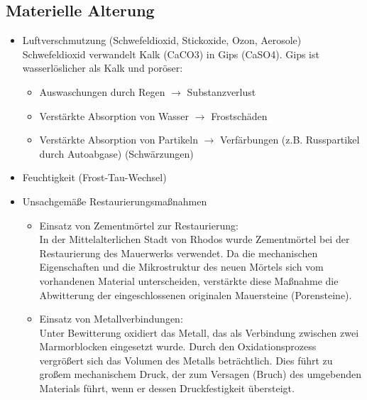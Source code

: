 \documentclass[fleqn,twoside,dvipsnames]{article}
\begin{document}
\begin{itemize}
        \subsection{Materielle Alterung} \label{EinflussBauteile}
                \begin{itemize}
                    \item Luftverschmutzung (Schwefeldioxid, Stickoxide, Ozon, Aerosole)\\
                        Schwefeldioxid verwandelt Kalk (CaCO3) in Gips (CaSO4). Gips ist wasserlöslicher als Kalk und poröser:
                            \begin{itemize}
                                \item Auswaschungen durch Regen $\rightarrow$ Substanzverlust
                                \item Verstärkte Absorption von Wasser $\rightarrow$ Frostschäden
                                \item Verstärkte Absorption von Partikeln $\rightarrow$ Verfärbungen (z.B. Russpartikel durch Autoabgase) (Schwärzungen)
                            \end{itemize}
                    \item Feuchtigkeit (Frost-Tau-Wechsel)
                    \item Unsachgemäße Restaurierungsmaßnahmen
                        \begin{itemize}
                            \item Einsatz von Zementmörtel zur Restaurierung:\\
                                In der Mittelalterlichen Stadt von Rhodos wurde Zementmörtel bei der Restaurierung des Mauerwerks verwendet. Da die mechanischen Eigenschaften und die Mikrostruktur des neuen Mörtels sich vom vorhandenen Material unterscheiden, verstärkte diese Maßnahme die Abwitterung der eingeschlossenen originalen Mauersteine (Porensteine).
                            \item Einsatz von Metallverbindungen:\\
                                Unter Bewitterung oxidiert das Metall, das als Verbindung zwischen zwei Marmorblocken eingesetzt wurde. Durch den Oxidationsprozess vergrößert sich das Volumen des Metalls beträchtlich. Dies führt zu großem mechanischem Druck, der zum Versagen (Bruch) des umgebenden Materials führt, wenn er dessen Druckfestigkeit übersteigt.
                        \end{itemize}
                \end{itemize}    
        \end{itemize}
\end{document}
